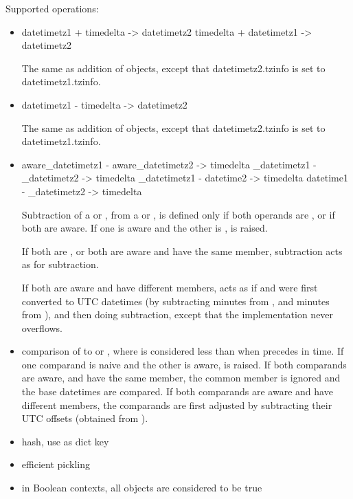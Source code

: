 Supported operations:

\begin{itemize}
  \item
    datetimetz1 + timedelta -> datetimetz2
    timedelta + datetimetz1 -> datetimetz2

    The same as addition of  objects, except that
    datetimetz2.tzinfo is set to datetimetz1.tzinfo.

  \item
    datetimetz1 - timedelta -> datetimetz2

    The same as addition of  objects, except that
    datetimetz2.tzinfo is set to datetimetz1.tzinfo.

  \item
    aware_datetimetz1 - aware_datetimetz2 -> timedelta
    {\naive}_datetimetz1 - {\naive}_datetimetz2 -> timedelta
    {\naive}_datetimetz1 - datetime2 -> timedelta
    datetime1 - {\naive}_datetimetz2 -> timedelta

    Subtraction of a  or , from a
     or , is defined only if both
    operands are \naive, or if both are aware.  If one is aware and the
    other is \naive,  is raised.

    If both are \naive, or both are aware and have the same 
    member, subtraction acts as for  subtraction.

    If both are aware and have different  members,
     acts as if  and  were first converted to UTC
    datetimes (by subtracting  minutes from ,
    and  minutes from ), and then doing
     subtraction, except that the implementation never
    overflows.

  \item
    comparison of  to  or
    , where  is considered less than 
    when  precedes  in time.  If one comparand is naive and
    the other is aware,  is raised.  If both
    comparands are aware, and have the same  member,
    the common  member is ignored and the base datetimes
    are compared.  If both comparands are aware and have different
     members, the comparands are first adjusted by
    subtracting their UTC offsets (obtained from ).

  \item
    hash, use as dict key

  \item
    efficient pickling

  \item
    in Boolean contexts, all  objects are considered to be
    true
\end{itemize}


